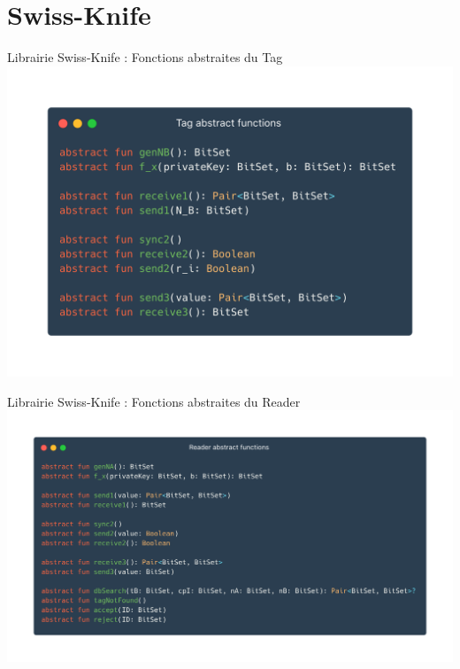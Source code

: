\documentclass[aspectratio=169]{beamer}
\begin{document}
\section{Swiss-Knife}

\begin{frame}{Librairie Swiss-Knife : Fonctions abstraites du Tag}
  \centering
  \includegraphics[height=\textheight]{../assets/tagAbs}
\end{frame}

\begin{frame}{Librairie Swiss-Knife : Fonctions abstraites du Reader}
  \centering
  \includegraphics[height=\textheight]{../assets/readerAbs}
\end{frame}
\end{document}
